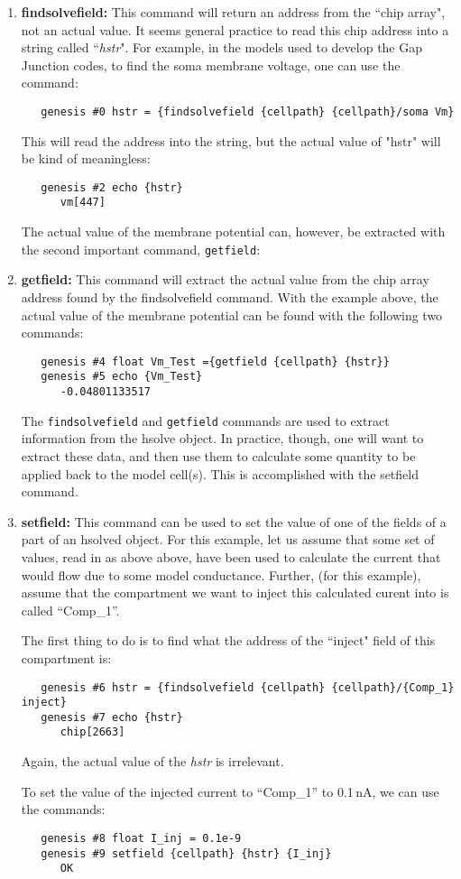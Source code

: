 \documentclass[12pt]{article}
\begin{document}
\begin{enumerate}

\item{\bf findsolvefield:} This command will return an address from the ``chip array", not an actual value. It seems general practice to read this chip address into a string called ``{\it hstr}". For example, in the models used to develop the Gap Junction codes, to find the soma membrane voltage, one can use the command:

\begin{verbatim}
   genesis #0 hstr = {findsolvefield {cellpath} {cellpath}/soma Vm}
\end{verbatim}
This will read the address into the string, but the actual value of "hstr" will be kind of meaningless:
\begin{verbatim}
   genesis #2 echo {hstr}
      vm[447]
\end{verbatim}
The actual value of the membrane potential can, however, be extracted with the second important command, {\tt getfield}:

\item{\bf getfield:} This command will extract the actual value from the chip array address found by the findsolvefield command. With the example above, the actual value of the membrane potential can be found with the following two commands:
\begin{verbatim}
   genesis #4 float Vm_Test ={getfield {cellpath} {hstr}}
   genesis #5 echo {Vm_Test}
      -0.04801133517
\end{verbatim}
The {\tt findsolvefield} and {\tt getfield} commands are used to extract information from the hsolve object. In practice, though, one will want to extract these data, and then use them to calculate some quantity to be applied back to the model cell(s). This is accomplished with the setfield command.

\item{\bf setfield:} This command can be used to set the value of one of the fields of a part of an hsolved object. For this example, let us assume that some set of values, read in as above above, have been used to calculate the current that would flow due to some model conductance. Further, (for this example), assume that the compartment we want to inject this calculated curent into is called ``Comp\_1''.

The first thing to do is to find what the address of the ``inject" field of this compartment is:
\begin{verbatim}
   genesis #6 hstr = {findsolvefield {cellpath} {cellpath}/{Comp_1} inject}
   genesis #7 echo {hstr}
      chip[2663]
\end{verbatim}
Again, the actual value of the {\it hstr} is irrelevant.

To set the value of the injected current to ``Comp\_1'' to 0.1\,nA, we can use the commands:
\begin{verbatim}
   genesis #8 float I_inj = 0.1e-9
   genesis #9 setfield {cellpath} {hstr} {I_inj}
      OK
\end{verbatim}
\end{enumerate}
\end{document}
